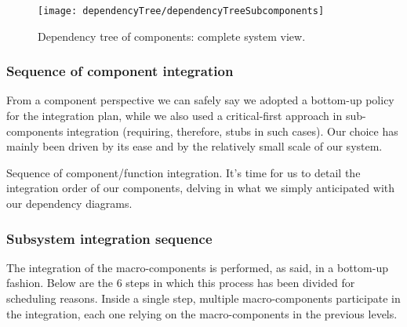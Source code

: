 	\vfill
	
	\begin{figure}[H]
		\centering
		\texttt{[image: dependencyTree/dependencyTreeSubcomponents]}
		\caption{Dependency tree of components: complete system view.}
		\label{DependencyTreeComplete}
	\end{figure}

\subsubsection{Sequence of component integration}
	From a component perspective we can safely say we adopted a bottom-up policy for the integration plan, while we also used a critical-first approach in sub-components integration (requiring, therefore, stubs in such cases). 
	Our choice has mainly been driven by its ease and by the relatively small scale of our system.
	
	Sequence of component/function integration.
	It's time for us to detail the integration order of our components, delving in what we simply anticipated with our dependency diagrams.
	
	

\vfill
\subsubsection{Subsystem integration sequence}
	The integration of the macro-components is performed, as said, in a bottom-up fashion. Below are the 6 steps in which this process has been divided for scheduling reasons.
	Inside a single step, multiple macro-components participate in the integration, each one relying on the macro-components in the previous levels.
	
